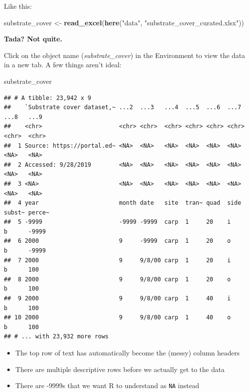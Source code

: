 \documentclass[]{book}
\newenvironment{Shaded}{\begin{snugshade}}{\end{snugshade}}
\newcommand{\KeywordTok}[1]{\textcolor[rgb]{0.13,0.29,0.53}{\textbf{#1}}}
\newcommand{\NormalTok}[1]{#1}
\newcommand{\StringTok}[1]{\textcolor[rgb]{0.31,0.60,0.02}{#1}}
\providecommand{\tightlist}{%
  \setlength{\itemsep}{0pt}\setlength{\parskip}{0pt}}
\begin{document}
Like this:

\begin{Shaded}
\begin{Highlighting}[]
\NormalTok{substrate_cover <-}\StringTok{ }\KeywordTok{read_excel}\NormalTok{(}\KeywordTok{here}\NormalTok{(}\StringTok{"data"}\NormalTok{, }\StringTok{"substrate_cover_curated.xlsx"}\NormalTok{))}
\end{Highlighting}
\end{Shaded}

\textbf{Tada? Not quite.}

Click on the object name (\emph{substrate\_cover}) in the Environment to view the data in a new tab. A few things aren't ideal:

\begin{Shaded}
\begin{Highlighting}[]
\NormalTok{substrate_cover}
\end{Highlighting}
\end{Shaded}

\begin{verbatim}
## # A tibble: 23,942 x 9
##    `Substrate cover dataset,~ ...2  ...3   ...4  ...5  ...6  ...7  ...8   ...9  
##    <chr>                      <chr> <chr>  <chr> <chr> <chr> <chr> <chr>  <chr> 
##  1 Source: https://portal.ed~ <NA>  <NA>   <NA>  <NA>  <NA>  <NA>  <NA>   <NA>  
##  2 Accessed: 9/28/2019        <NA>  <NA>   <NA>  <NA>  <NA>  <NA>  <NA>   <NA>  
##  3 <NA>                       <NA>  <NA>   <NA>  <NA>  <NA>  <NA>  <NA>   <NA>  
##  4 year                       month date   site  tran~ quad  side  subst~ perce~
##  5 -9999                      -9999 -9999  carp  1     20    i     b      -9999 
##  6 2000                       9     -9999  carp  1     20    o     b      -9999 
##  7 2000                       9     9/8/00 carp  1     20    i     b      100   
##  8 2000                       9     9/8/00 carp  1     20    o     b      100   
##  9 2000                       9     9/8/00 carp  1     40    i     b      100   
## 10 2000                       9     9/8/00 carp  1     40    o     b      100   
## # ... with 23,932 more rows
\end{verbatim}

\begin{itemize}
\tightlist
\item
  The top row of text has automatically become the (messy) column headers
\item
  There are multiple descriptive rows before we actually get to the data
\item
  There are -9999s that we want R to understand as \texttt{NA} instead
\end{itemize}
\end{document}
